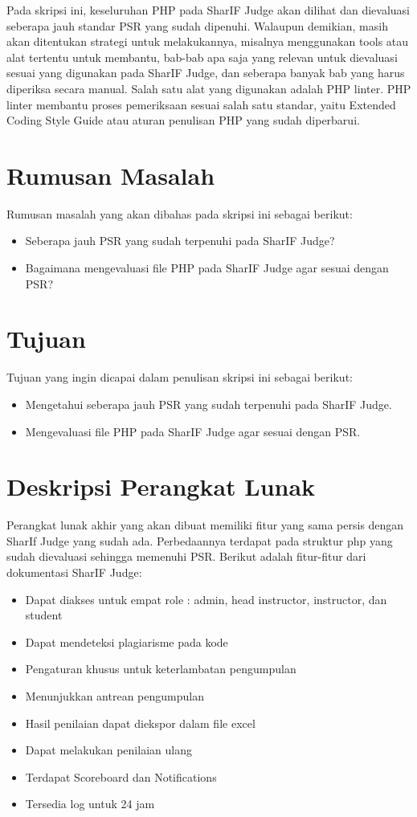 \documentclass[a4paper,twoside]{article}
\begin{document}
Pada skripsi ini, keseluruhan PHP pada SharIF Judge akan dilihat dan dievaluasi seberapa jauh standar PSR yang sudah dipenuhi. Walaupun demikian, masih akan ditentukan strategi untuk melakukannya, misalnya menggunakan tools atau alat tertentu untuk membantu, bab-bab apa saja yang relevan untuk dievaluasi sesuai yang digunakan pada SharIF Judge, dan seberapa banyak bab yang harus diperiksa secara manual. Salah satu alat yang digunakan adalah PHP linter. PHP linter membantu proses pemeriksaan sesuai salah satu standar, yaitu Extended Coding Style Guide atau aturan penulisan PHP yang sudah diperbarui. 

\section{Rumusan Masalah}
Rumusan masalah yang akan dibahas pada skripsi ini sebagai berikut:
\begin{itemize}
	\item Seberapa jauh PSR yang sudah terpenuhi pada SharIF Judge?
	\item Bagaimana mengevaluasi file PHP pada SharIF Judge agar sesuai dengan PSR?  
\end{itemize}

\section{Tujuan}
Tujuan yang ingin dicapai dalam penulisan skripsi ini sebagai berikut:
\begin{itemize}
	\item Mengetahui seberapa jauh PSR yang sudah terpenuhi pada SharIF Judge.
	\item Mengevaluasi file PHP pada SharIF Judge agar sesuai dengan PSR.
\end{itemize}

\section{Deskripsi Perangkat Lunak}
Perangkat lunak akhir yang akan dibuat memiliki fitur yang sama persis dengan SharIf Judge yang sudah ada. Perbedaannya terdapat pada struktur php yang sudah dievaluasi sehingga memenuhi PSR. Berikut adalah fitur-fitur dari dokumentasi SharIF Judge:
\begin{itemize}
	\item Dapat diakses untuk empat role : admin, head instructor, instructor, dan student
	\item Dapat mendeteksi plagiarisme pada kode
	\item Pengaturan khusus untuk keterlambatan pengumpulan
	\item Menunjukkan antrean pengumpulan
	\item Hasil penilaian dapat diekspor dalam file excel
	\item Dapat melakukan penilaian ulang
	\item Terdapat Scoreboard dan Notifications
	\item Tersedia log untuk 24 jam 
\end{itemize}
\end{document}
